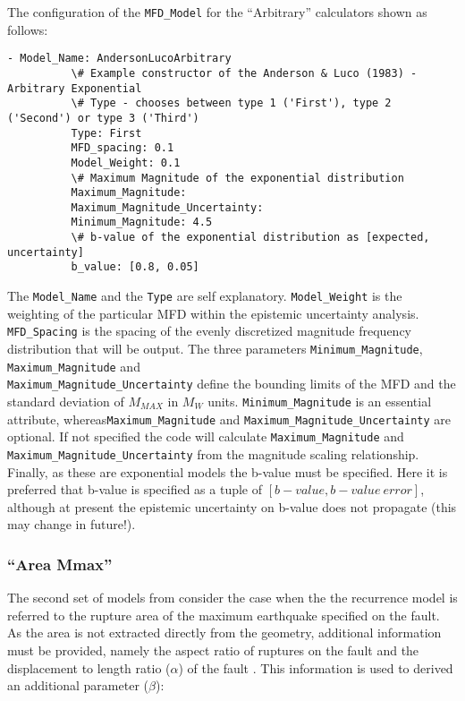 The configuration of the \verb=MFD_Model= for the \cite{AndersonLuco1983} ``Arbitrary'' calculators shown as follows:

\begin{Verbatim}[frame=single, commandchars=\\\{\}, fontsize=\scriptsize]
        - Model_Name: AndersonLucoArbitrary
          \# Example constructor of the Anderson & Luco (1983) - Arbitrary Exponential
          \# Type - chooses between type 1 ('First'), type 2 ('Second') or type 3 ('Third')
          Type: First
          MFD_spacing: 0.1
          Model_Weight: 0.1
          \# Maximum Magnitude of the exponential distribution
          Maximum_Magnitude:
          Maximum_Magnitude_Uncertainty:
          Minimum_Magnitude: 4.5
          \# b-value of the exponential distribution as [expected, uncertainty]
          b_value: [0.8, 0.05]
\end{Verbatim}

The \verb=Model_Name= and the \verb=Type= are self explanatory. \verb=Model_Weight= is the weighting of the particular MFD within the epistemic uncertainty analysis. \verb=MFD_Spacing= is the spacing of the evenly discretized magnitude frequency distribution that will be output. The three parameters \verb=Minimum_Magnitude=, \verb=Maximum_Magnitude= and \\ \verb=Maximum_Magnitude_Uncertainty= define the bounding limits of the MFD and the standard deviation of $M_{MAX}$ in $M_W$ units. \verb=Minimum_Magnitude= is an essential attribute, whereas\verb=Maximum_Magnitude= and \verb=Maximum_Magnitude_Uncertainty= are optional. If not specified the code will calculate \verb=Maximum_Magnitude= and \verb=Maximum_Magnitude_Uncertainty= from the magnitude scaling relationship. Finally, as these are exponential models the b-value must be specified. Here it is preferred that b-value is specified as a tuple of $\left[ {b-value, b-value\ error} \right]$, although at present the epistemic uncertainty on b-value does not propagate (this may change in future!).  

\subsubsection{\cite{AndersonLuco1983} ``Area Mmax''}

The second set of models from \cite{AndersonLuco1983} consider the case when the the recurrence model is referred to the rupture area of the maximum earthquake specified on the fault. As the area is not extracted directly from the geometry, additional information must be provided, namely the aspect ratio of ruptures on the fault and the displacement to length ratio ($\alpha$) of the fault \cite{Bungum2007}. This information is used to derived an additional parameter ($\beta$):

